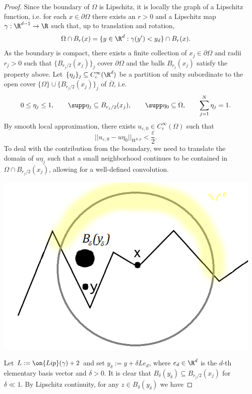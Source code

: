 \documentclass[reqno]{amsart}
\theoremstyle{definition}
\theoremstyle{remark}
\renewcommand{\epsilon}{\varepsilon}
\begin{document}
\begin{proof}
	Since the boundary of $\Omega$ is Lipschitz, it is locally the graph of a Lipschitz function, i.e. for each $x \in \partial \Omega$ there exists an $r > 0$ and a Lipschitz map $\gamma: \R^{d - 1} \to \R$ such that, up to translation and rotation, 
		\[ \Omega \cap B_r (x) = \{ y \in \R^d : \gamma (y') < y_d \} \cap B_r (x).  \]
	As the boundary is compact, there exists a finite collection of $x_j \in \partial \Omega$ and radii $r_j > 0$ such that $\{ B_{r_j /2} (x_j) \}_j$ cover $\partial \Omega$ and the balls $B_{r_j} (x_j)$ satisfy the property above. Let $\{ \eta_j \}_j \subseteq C^\infty_c (\R^d)$ be a partition of unity subordinate to the open cover $\{ \Omega\} \cup \{ B_{r_j/2} (x_j) \}_j$ of $\overline \Omega$, i.e.
		\[ 0 \leq \eta_j \leq 1, \qquad \supp \eta_j \subseteq B_{r_j/2} (x_j), \qquad \supp \eta_0 \subseteq \Omega, \qquad \sum_{j = 1}^N \eta_j = 1.  \]
	By smooth local approximation, there exists $u_{\epsilon, 0} \in C^\infty_c (\Omega)$ such that
		\[ ||u_{\epsilon, 0} - u \eta_0||_{W^{k, p}} < \frac{\epsilon}{2}. \]
	To deal with the contribution from the boundary, we need to translate the domain of $u\eta_j$ such that a small neighborhood continues to be contained in $\Omega \cap B_{r_j/2} (x_j)$, allowing for a well-defined convolution. 	
	\begin{center}
		\includegraphics[scale = 0.5]{boundary.png}
	\end{center}
	Let $L := \on{Lip} (\gamma) + 2$ and set $y_\delta := y + \delta L e_d$, where $e_d \in \R^d$ is the $d$-th elementary basis vector and $\delta > 0$. It is clear that $B_\delta (y_\delta) \subseteq B_{r_j/2} (x_j)$ for $\delta \ll 1$. By Lipschitz continuity, for any $z \in B_\delta (y_\delta)$ we have

\end{proof}
\end{document}
